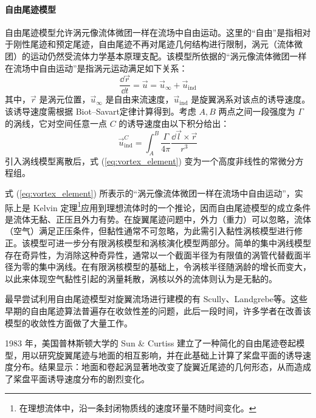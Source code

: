 \paragraph{自由尾迹模型}

自由尾迹模型允许涡元像流体微团一样在流场中自由运动。这里的“自由”是指相对于刚性尾迹和预定尾迹，自由尾迹不再对尾迹几何结构进行限制，涡元（流体微团）的运动仍然受流体力学基本原理支配。该模型所依据的“涡元像流体微团一样在流场中自由运动”是指涡元运动满足如下关系：
\begin{equation}
\frac{\dd\vec{r}}{\dd t}=\vec{u}=\vec{u}_{\infty}+\vec{u}_{\mathrm{ind}}\label{eq:vortex_element}
\end{equation}
其中，$\vec{r}$ 是涡元位置，$\vec{u}_{\infty}$ 是自由来流速度，$\vec{u}_{\mathrm{ind}}$
是旋翼涡系对该点的诱导速度。该诱导速度需根据 Biot–Savart定律计算得到。考虑
$A,B$ 两点之间一段强度为 $\Gamma$ 的涡线，它对空间任意一点 $C$ 的诱导速度由以下积分给出：
\begin{equation}
\vec{u}_{\mathrm{ind}}^{C}=\int_{A}^{B}\frac{\Gamma}{4\pi}\frac{\dd\vec{l}\times\vec{r}}{r^{3}}
\end{equation}
引入涡线模型离散后，式 (\ref{eq:vortex_element}) 变为一个高度非线性的常微分方程组。

式 (\ref{eq:vortex_element}) 所表示的“涡元像流体微团一样在流场中自由运动”，实际上是 Kelvin 定理\footnote{在理想流体中，沿一条封闭物质线的速度环量不随时间变化。}应用到理想流体时的一个推论，因而自由尾迹模型的成立条件是流体无黏、正压且外力有势。在旋翼尾迹问题中，外力（重力）可以忽略，流体（空气）满足正压条件，但黏性通常不可忽略，为此需引入黏性涡核模型进行修正。该模型可进一步分有限涡核模型和涡核演化模型两部分。简单的集中涡线模型存在奇异性，为消除这种奇异性，通常以一个截面半径为有限值的涡管代替截面半径为零的集中涡线。在有限涡核模型的基础上，令涡核半径随涡龄的增长而变大，以此来体现空气黏性引起的涡量耗散，涡核以外的流体则认为是无黏的。

最早尝试利用自由尾迹模型对旋翼流场进行建模的有 Scully、Landgrebe等。这些早期的自由尾迹算法普遍存在收敛性差的问题，此后一段时间，许多学者在改善该模型的收敛性方面做了大量工作。

1983 年，美国普林斯顿大学的 Sun \& Curtiss 建立了一种简化的自由尾迹卷起模型，用以研究旋翼尾迹与地面的相互影响，并在此基础上计算了桨盘平面的诱导速度分布。结果显示：地面和卷起涡显著地改变了旋翼近尾迹的几何形态，从而造成了桨盘平面诱导速度分布的剧烈变化。


